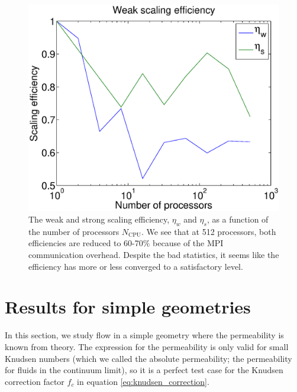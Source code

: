 \begin{figure}[h]
\begin{center}
\includegraphics[width=\textwidth, trim=0cm 0cm 0cm 0cm, clip]{DSMC/figures/scaling.eps}
\end{center}
\caption{The weak and strong scaling efficiency, $\eta_w$ and $\eta_s$, as a function of the number of processors $N_\text{CPU}$. We see that at 512 processors, both efficiencies are reduced to 60-70\% because of the MPI communication overhead. Despite the bad statistics, it seems like the efficiency has more or less converged to a satisfactory level.}
\label{fig:dsmc_scaling}
\end{figure}

\section{Results for simple geometries}
\label{sec:results_for_simple_geometries}
In this section, we study flow in a simple geometry where the permeability is known from theory. The expression for the permeability is only valid for small Knudsen numbers (which we called the absolute permeability; the permeability for fluids in the continuum limit), so it is a perfect test case for the Knudsen correction factor $f_c$ in equation \eqref{eq:knudsen_correction}. 
